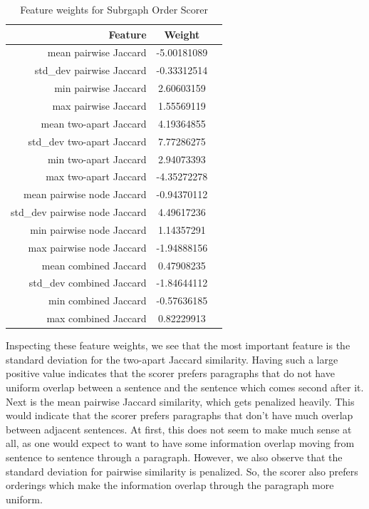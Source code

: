 \documentclass[12pt]{article}
\begin{document}
\begin{table}
\centering
\begin{tabular}{|r|c|c|}
\hline
Feature & Weight \\ \hline\hline
mean pairwise Jaccard & -5.00181089 \\ \hline
std\_dev pairwise Jaccard & -0.33312514 \\ \hline
min pairwise Jaccard & 2.60603159 \\ \hline
max pairwise Jaccard & 1.55569119 \\ \hline
mean two-apart Jaccard & 4.19364855 \\ \hline
std\_dev two-apart Jaccard & 7.77286275 \\ \hline
min two-apart Jaccard & 2.94073393 \\ \hline
max two-apart Jaccard & -4.35272278 \\ \hline
mean pairwise node Jaccard & -0.94370112 \\ \hline
std\_dev pairwise node Jaccard & 4.49617236 \\ \hline
min pairwise node Jaccard & 1.14357291 \\ \hline
max pairwise node Jaccard & -1.94888156 \\ \hline
mean combined Jaccard & 0.47908235 \\ \hline
std\_dev combined Jaccard & -1.84644112 \\ \hline
min combined Jaccard & -0.57636185 \\ \hline
max combined Jaccard & 0.82229913 \\ \hline
\end{tabular}
\caption{Feature weights for Subrgaph Order Scorer}
\end{table}

Inspecting these feature weights, we see that the most important feature is the
standard deviation for the two-apart Jaccard similarity. Having such a large
positive value indicates that the scorer prefers paragraphs that do not have
uniform overlap between a sentence and the sentence which comes second after
it. Next is the mean pairwise Jaccard similarity, which gets penalized heavily.
This would indicate that the scorer prefers paragraphs that don't have much
overlap between adjacent sentences. At first, this does not seem to make much
sense at all, as one would expect to want to have some information overlap
moving from sentence to sentence through a paragraph. However, we also observe
that the standard deviation for pairwise similarity is penalized. So, the
scorer also prefers orderings which make the information overlap through the
paragraph more uniform.
\end{document}
